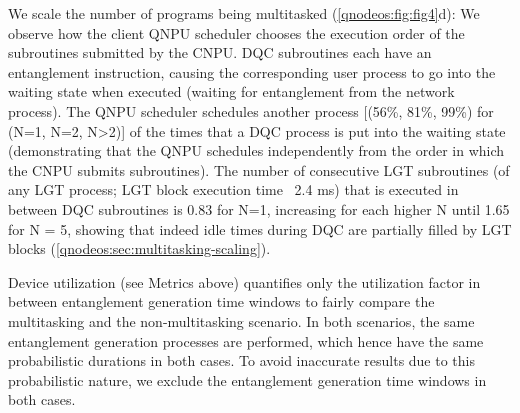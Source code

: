 We scale the number of programs being multitasked (\cref{qnodeos:fig:fig4}d): We observe how the client QNPU scheduler chooses the execution order of the subroutines submitted by the CNPU.
DQC subroutines each have an entanglement instruction, causing the corresponding user process to go into the waiting state when executed (waiting for entanglement from the network process).
The QNPU scheduler schedules another process [(56\%, 81\%, 99\%) for (N=1, N=2, N>2)] of the times that a DQC process is put into the waiting state (demonstrating that the QNPU schedules independently from the order in which the CNPU submits subroutines).
The number of consecutive LGT subroutines (of any LGT process; LGT block execution time ~2.4 ms) that is executed in between DQC subroutines is 0.83 for N=1, increasing for each higher N until 1.65 for N = 5, showing that indeed idle times during DQC are partially filled by LGT blocks (\cref{qnodeos:sec:multitasking-scaling}).

Device utilization (see Metrics above) quantifies only the utilization factor in between entanglement generation time windows to fairly compare the multitasking and the non-multitasking scenario.
In both scenarios, the same entanglement generation processes are performed, which hence have the same probabilistic durations in both cases.
To avoid inaccurate results due to this probabilistic nature, we exclude the entanglement generation time windows in both cases.
